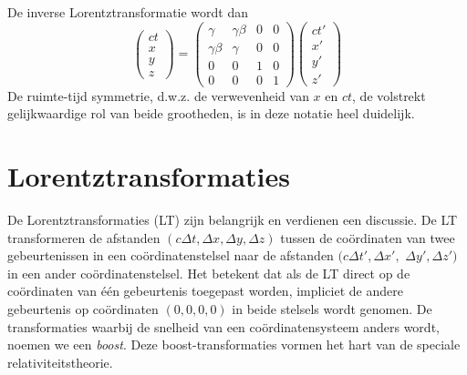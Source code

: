 De inverse Lorentztransformatie wordt dan 
\begin{equation}\label{v:lorentz12}
\left( \begin{array}{c} ct \\ x \\ y \\ z \end{array} \right) =
\left( \begin{array}{cccc} \gamma & \gamma \beta & 0 & 0  \\ \gamma\beta & \gamma & 0 & 0  \\ 0 & 0 & 1 & 0  \\ 0 & 0 & 0 & 1 
\end{array} \right) 
\left( \begin{array}{c} ct' \\ x' \\ y' \\ z' \end{array} \right) 
\end{equation}
De ruimte-tijd symmetrie, d.w.z. de verwevenheid van $x$ en $ct$, de 
volstrekt gelijkwaardige rol van beide grootheden, is in deze notatie heel 
duidelijk.

\section{Lorentztransformaties}
De Lorentztransformaties (LT) zijn belangrijk en verdienen een
discussie. De LT transformeren de afstanden $(c\Delta t, \Delta x,
\Delta y, \Delta z)$ tussen de co\"ordinaten van twee gebeurtenissen in
een co\"ordinatenstelsel naar de afstanden $(c\Delta t', \Delta x',$ $
\Delta y', \Delta z')$ in een ander co\"ordinatenstelsel. Het betekent
dat als de LT direct op de co\"ordinaten van \'e\'en gebeurtenis
toegepast worden, impliciet de andere gebeurtenis op co\"ordinaten
$(0,0,0,0)$ in beide stelsels wordt genomen. De transformaties waarbij
de snelheid van een co\"ordinatensysteem anders wordt, noemen we een
{\it boost}. Deze boost-transformaties vormen het hart van de speciale
relativiteitstheorie.


